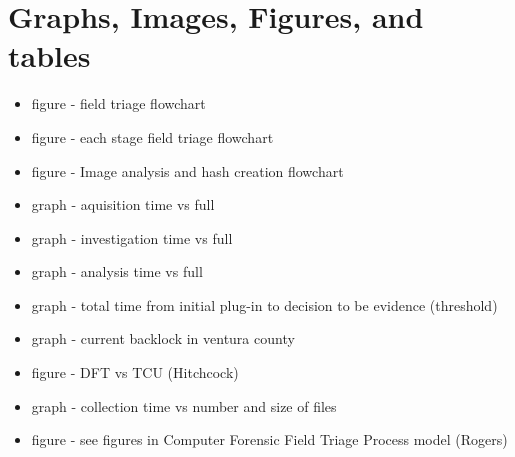 \documentclass[12pt]{article}
\begin{document}
\section{Graphs, Images, Figures, and tables}
\begin{itemize}
  \item figure - field triage flowchart
  \item figure - each stage field triage flowchart
  \item figure - Image analysis and hash creation flowchart
  \item graph - aquisition time vs full
  \item graph - investigation time vs full
  \item graph - analysis time vs full
  \item graph - total time from initial plug-in to decision to be evidence (threshold)
  \item graph - current backlock in ventura county
  \item figure - DFT vs TCU (Hitchcock\cite{hitchcock2016tiered})
  \item graph - collection time vs number and size of files
  \item figure - see figures in Computer Forensic Field Triage Process model (Rogers)

\end{itemize}

\newpage


\end{document}
